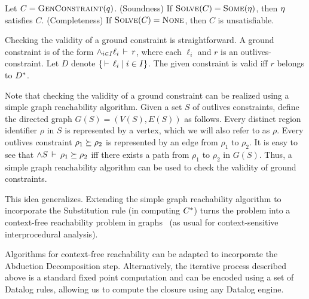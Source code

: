 \begin{theorem}
\label{thm:constraint-solver-sc}
Let $C = \textsc{GenConstraint}(q)$.
(Soundness) If $\textsc{Solve}(C) = \textsc{Some}(\eta)$, then $\eta$ satisfies $C$.
(Completeness) If $\textsc{Solve}(C) = \textsc{None}$, then $C$ is unsatisfiable.
\end{theorem}

Checking the validity of a ground constraint is straightforward.
A ground constraint is of the form $\wedge_{i \in I} \ell_i\,\vdash\,r$, where each
$\ell_i$ and $r$ is an outlives-constraint.
Let $D$ denote $\{ \,\vdash\,\ell_i \;|\; i \in I \}$.
The given constraint is valid iff $r$ belongs to ${D}^*$.

Note that checking the validity of a ground constraint can be realized using
a simple graph reachability algorithm.
%
Given a set $S$ of outlives constraints, define the directed
graph $G(S)=(V(S),E(S))$ as follows.
Every distinct region identifier $\rho$ in $S$ is represented by a vertex,
which we will also refer to as $\rho$.
Every outlives constraint $\rho_1 \succeq \rho_2$ is represented by
an edge from $\rho_1$ to $\rho_2$.
%
%
It is easy to see that $\wedge S\,\vdash\,\rho_1 \succeq \rho_2$ iff
there exists a path from $\rho_1$ to $\rho_2$ in $G(S)$.
%
Thus, a simple graph reachability algorithm can be used to check the validity of
ground constraints.

This idea generalizes.
Extending the simple graph reachability algorithm to incorporate the Substitution rule
(in computing ${C}^*$) turns the problem into a context-free reachability problem in graphs~\cite{Reps:Reachability}
(as usual for context-sensitive interprocedural analysis).

Algorithms for context-free reachability can be adapted to incorporate the Abduction Decomposition step.
Alternatively, the iterative process described above is a standard fixed point computation
and can be encoded using a set of Datalog rules, allowing us to compute the closure
using any Datalog engine.

